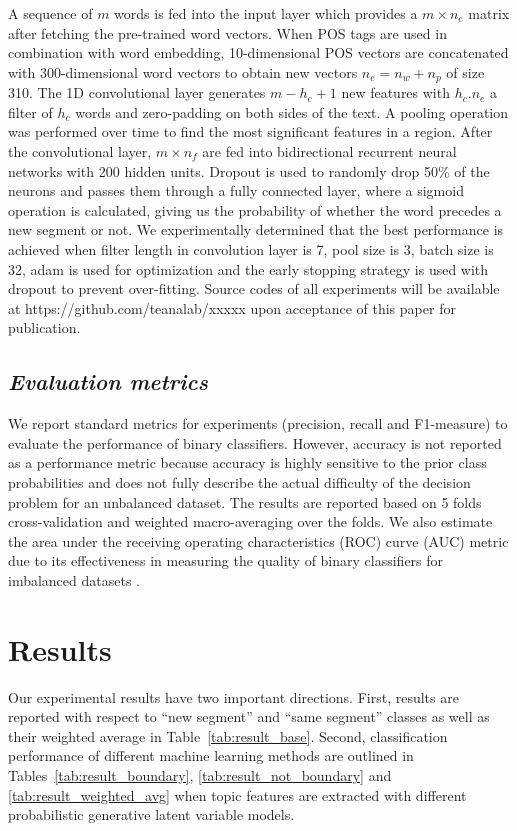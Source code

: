 \documentclass{amia}
\begin{document}
A sequence of $m$ words is fed into the input layer which provides a $m \times n_e$ matrix after fetching the pre-trained word vectors. When POS tags are used in combination with word embedding, 10-dimensional POS vectors are concatenated with 300-dimensional word vectors to obtain new vectors $n_e = n_w + n_p$ of size 310. The 1D convolutional layer generates $m - h_c + 1$ new features with $h_c.n_e$ a filter of $h_c$ words and zero-padding on both sides of the text. A pooling operation was performed over time to find the most significant features in a region. After the convolutional layer, $m \times n_f$ are fed into bidirectional recurrent neural networks with 200 hidden units. Dropout is used to randomly drop 50\% of the neurons and passes them through a fully connected layer, where a sigmoid operation is calculated, giving us the probability of whether the word precedes a new segment or not. We experimentally determined that the best performance is achieved when filter length in convolution layer is 7, pool size is 3, batch size is 32, adam\cite{kingma2014adam} is used for optimization and the early stopping strategy is used with dropout to prevent over-fitting. Source codes of all experiments will be available at https://github.com/teanalab/xxxxx upon acceptance of this paper for publication.                    
  
\subsection*{\textit{Evaluation metrics}}
We report standard metrics for experiments (precision, recall and F1-measure) to evaluate the performance of binary classifiers\cite{aas1999text}. However, accuracy is not reported as a performance metric because accuracy is highly sensitive to the prior class probabilities and does not fully describe the actual difficulty of the decision problem for an unbalanced dataset. The results are reported based on 5 folds cross-validation and weighted macro-averaging over the folds. We also estimate the area under the receiving operating characteristics (ROC) curve\cite{kumar2011receiver} (AUC) metric due to its effectiveness in measuring the quality of binary classifiers for imbalanced datasets \cite{hu2015kernelized}. 

\section*{Results}
Our experimental results have two important directions. First, results are reported with respect to ``new segment'' and ``same segment'' classes as well as their weighted average in Table~\ref{tab:result_base}. Second, classification performance of different machine learning methods are outlined in Tables~\ref{tab:result_boundary}, \ref{tab:result_not_boundary} and \ref{tab:result_weighted_avg} when topic features are extracted with different probabilistic generative latent variable models.\\
\end{document}
